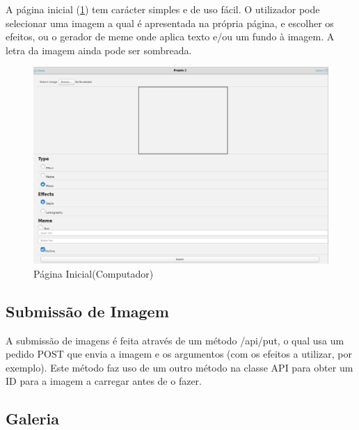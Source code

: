 \documentclass{report}
\begin{document}
A página inicial (\ref{HomePag}) tem carácter simples e de uso fácil. O utilizador pode selecionar uma imagem a qual é apresentada na própria página, e escolher os efeitos, ou o gerador de meme onde aplica texto e/ou um fundo à imagem. A letra da imagem ainda pode ser sombreada.
\begin{figure}[b]
 \center
 \includegraphics[scale=0.5]{final_home.png}
 \caption{Página Inicial(Computador)}
 \label{HomePag}
\end{figure}

\subsection{Submissão de Imagem}

A submissão de imagens é feita através de um método /api/put, o qual usa um pedido POST que envia a imagem e os argumentos (com os efeitos a utilizar, por exemplo). Este método faz uso de um outro método na classe API para obter um ID para a imagem a carregar antes de o fazer.

\subsection{Galeria}
\end{document}
